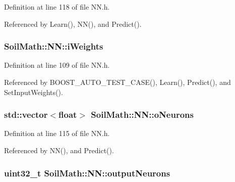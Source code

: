 Definition at line 118 of file N\+N.\+h.



Referenced by Learn(), N\+N(), and Predict().

\hypertarget{class_soil_math_1_1_n_n_a96b0fe3caeed3d285204a6b4506075c9}{}
\subsubsection[{i\+Weights}]{ Soil\+Math\+::\+N\+N\+::i\+Weights}\label{class_soil_math_1_1_n_n_a96b0fe3caeed3d285204a6b4506075c9}


Definition at line 109 of file N\+N.\+h.



Referenced by B\+O\+O\+S\+T\+\_\+\+A\+U\+T\+O\+\_\+\+T\+E\+S\+T\+\_\+\+C\+A\+S\+E(), Learn(), Predict(), and Set\+Input\+Weights().

\hypertarget{class_soil_math_1_1_n_n_a50a52b41982f6845dc5294f17607774b}{}
\subsubsection[{o\+Neurons}]{\setlength{\rightskip}{0pt plus 5cm}std\+::vector$<$float$>$ Soil\+Math\+::\+N\+N\+::o\+Neurons\hspace{0.3cm}{\ttfamily [private]}}\label{class_soil_math_1_1_n_n_a50a52b41982f6845dc5294f17607774b}


Definition at line 115 of file N\+N.\+h.



Referenced by N\+N(), and Predict().

\hypertarget{class_soil_math_1_1_n_n_a65ce6c65168fbe7051c25dccf4bf2b0c}{}
\subsubsection[{output\+Neurons}]{\setlength{\rightskip}{0pt plus 5cm}uint32\+\_\+t Soil\+Math\+::\+N\+N\+::output\+Neurons\hspace{0.3cm}{\ttfamily [private]}}\label{class_soil_math_1_1_n_n_a65ce6c65168fbe7051c25dccf4bf2b0c}


